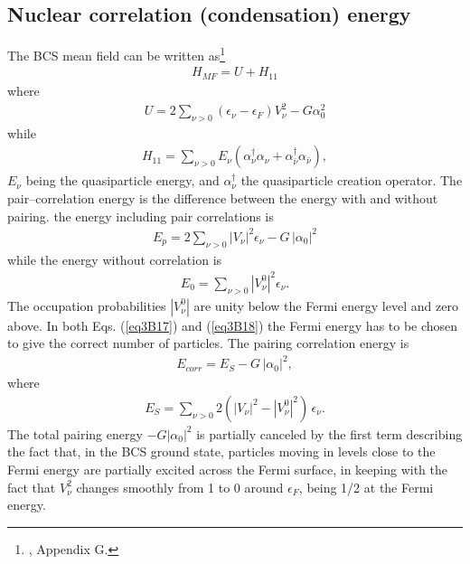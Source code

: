 \begin{subappendices}
\subsection{Nuclear correlation (condensation) energy}
The BCS mean field can be written as\footnote{\cite{Brink:05}, Appendix G.}
 \begin{align}\label{eq3B14}
H_{MF}=U+H_{11}
 \end{align} 
where
 \begin{align}\label{eq3B15}
 U=2\sum_{\nu>0}(\epsilon_\nu-\epsilon_F)V_\nu^2-G\alpha_0^2
 \end{align} 
while
 \begin{align}\label{eq3B16}
H_{11}=\sum_{\nu>0}E_\nu(\alpha_\nu^\dagger\alpha_\nu+\alpha_{\bar\nu}^\dagger\alpha_{\bar\nu}),
 \end{align} 
$E_\nu$ being the quasiparticle energy, and $\alpha^\dagger_\nu$ the quasiparticle creation operator. The pair--correlation energy is the difference between the energy with and without pairing. the energy including pair correlations is
 \begin{align}\label{eq3B17}
E_p=2\sum_{\nu>0}|V_\nu|^2\epsilon_\nu-G\,|\alpha_0|^2
 \end{align} 
 while the energy without correlation is
  \begin{align}\label{eq3B18}
  E_0=\sum_{\nu>0}|V^0_\nu|^2\epsilon_\nu.
  \end{align} 
 The occupation probabilities $|V^0_\nu|$ are unity below the Fermi energy level and zero above. In both Eqs. (\ref{eq3B17}) and (\ref{eq3B18}) the Fermi energy has to be chosen to give the correct number of particles. The pairing correlation energy is 
   \begin{align}\label{eq3B19}
E_{corr}=E_S-G\,|\alpha_0|^2,
   \end{align} 
 where
   \begin{align}\label{eq3B20}
E_S=\sum_{\nu>0}2(|V_\nu|^2-|V^0_\nu|^2)\,\epsilon_\nu.
   \end{align}  
 The total pairing energy $-G|\alpha_0|^2$ is partially canceled by the first term describing the fact that, in the BCS ground state, particles moving in levels close to the Fermi energy are partially excited across the Fermi surface, in keeping with the fact that $V_\nu^2$ changes smoothly from 1 to 0 around $\epsilon_F$, being 1/2 at the Fermi energy.
 

\end{subappendices}

